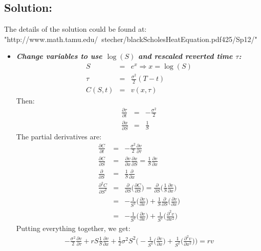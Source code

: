 \subsection{Solution:}
The details of the solution could be found at:\\
"http://www.math.tamu.edu/~stecher/blackScholesHeatEquation.pdf425/Sp12/"
\begin{itemize}
	\item \textbf{\textit{Change variables to use $\log(S)$ and rescaled reverted time $\tau $:}}
	\begin{eqnarray}
		S &=& e^{x} \Rightarrow x = \log(S)\\
		\tau &=& \frac{\sigma^{2}}{2}(T - t)\\
		C(S, t) &=& v(x, \tau)
	\end{eqnarray}
	Then:
	\begin{eqnarray}
	\frac{\partial\tau}{\partial t} &=& -\frac{\sigma^{2}}{2}\\	
	\frac{\partial x}{\partial S} &=& \frac{1}{S}
	\end{eqnarray}
	The partial derivatives are:
	\begin{eqnarray}
		\frac{\partial C}{\partial t} &=& -\frac{\sigma^{2}}{2}\frac{\partial v}{\partial\tau}\\
		\frac{\partial C}{\partial S} &=& \frac{\partial v}{\partial x}\frac{\partial x}{\partial S} = \frac{1}{S}\frac{\partial v}{\partial x}\\
		\frac{\partial}{\partial S} &=& \frac{1}{S}\frac{\partial}{\partial x}\\
		\nonumber
		\frac{\partial ^{2}C}{\partial S^{2}} &=& \frac{\partial}{\partial S}\bigg(\frac{\partial C}{\partial S}\bigg) = \frac{\partial}{\partial S}\bigg(\frac{1}{S}\frac{\partial v}{\partial x}\bigg)\\
		\nonumber
		&=& -\frac{1}{S^{2}}\bigg(\frac{\partial v}{\partial x}\bigg) + \frac{1}{S}\frac{\partial }{\partial S}\bigg(\frac{\partial v}{\partial x}\bigg)\\
		&=& -\frac{1}{S^{2}}\bigg(\frac{\partial v}{\partial x}\bigg) + \frac{1}{S^{2}}\bigg(\frac{\partial^{2} v}{\partial x^{2}}\bigg)
	\end{eqnarray}
	Putting everything together, we get:
	\begin{eqnarray}
		-\frac{\sigma^{2}}{2}\frac{\partial v}{\partial \tau} + rS\frac{1}{S}\frac{\partial v}{\partial x}  + \frac{1}{2}\sigma^{2}S^{2}\bigg(-\frac{1}{S^{2}}\bigg(\frac{\partial v}{\partial x}\bigg) + \frac{1}{S^{2}}\bigg(\frac{\partial^{2} v}{\partial x^{2}}\bigg)\bigg) = rv

\end{eqnarray}
\end{itemize}
